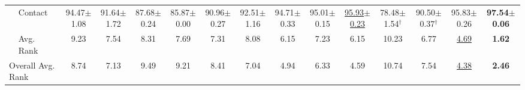 \begin{table}[t]
{\begin{tabular}{llccccccccccccc}
 & Contact & 94.47{\scriptsize$\pm$1.08} & 91.64{\scriptsize$\pm$1.72} & 87.68{\scriptsize$\pm$0.24} & 85.87{\scriptsize$\pm$0.00} & 90.96{\scriptsize$\pm$0.27} & 92.51{\scriptsize$\pm$1.16} & 94.71{\scriptsize$\pm$0.33} & 95.01{\scriptsize$\pm$0.15} & \underline{95.93{\scriptsize$\pm$0.23}} & 78.48{\scriptsize$\pm$1.54}$^\dagger$ & 90.50{\scriptsize$\pm$0.37}$^\dagger$ & 95.83{\scriptsize$\pm$0.26} & \textbf{97.54{\scriptsize$\pm$0.06}} \\
\cmidrule{2-15}
 & Avg. Rank & 9.23 & 7.54 & 8.31 & 7.69 & 7.31 & 8.08 & 6.15 & 7.23 & 6.15 & 10.23 & 6.77 & \underline{4.69} & \textbf{1.62} \\
\midrule
\multicolumn{2}{l}{Overall Avg. Rank} & 8.74 & 7.13 & 9.49 & 9.21 & 8.41 & 7.04 & 4.94 & 6.33 & 4.59 & 10.74 & 7.54 & \underline{4.38} & \textbf{2.46} \\
\bottomrule
\end{tabular}}
\end{table}
